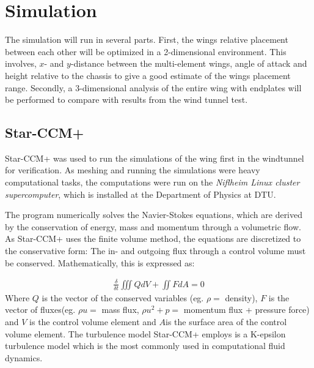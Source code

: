 \chapter{Simulation}
\label{chap:simulations}

  The simulation will run in several parts. First, the wings relative placement between each other will be optimized in a 2-dimensional environment. This involves, $x$- and $y$-distance between the multi-element wings, angle of attack and height relative to the chassis to give a good estimate of the wings placement range. Secondly, a 3-dimensional analysis of the entire wing with endplates will be performed to compare with results from the wind tunnel test. %

\section{Star-CCM+}
  Star-CCM+ was used to run the simulations of the wing first in the windtunnel for verification. As meshing and running the simulations were heavy computational tasks, the computations were run on the \emph{Niflheim Linux cluster supercomputer}, which is installed at the Department of Physics at DTU.

  The program numerically solves the Navier-Stokes equations, which are derived by the conservation of energy, mass and momentum through a volumetric flow. As Star-CCM+ uses the finite volume method, the equations are discretized to the conservative form: The in- and outgoing flux through a control volume must be conserved. Mathematically, this is expressed as:

  \begin{align}
    \frac{\delta}{\delta t} \iiint Q dV + \iint F dA = 0
  \end{align}
  Where $Q$ is the vector of the conserved variables (eg. $\rho =$ density), $F$ is the vector of fluxes(eg. $\rho u =$ mass flux, $\rho u^2 + p=$ momentum flux + pressure force) and $V$ is the control volume element and $A$is the surface area of the control volume element. The turbulence model Star-CCM+ employs is a K-epsilon turbulence model which is the most commonly used in computational fluid dynamics. %

